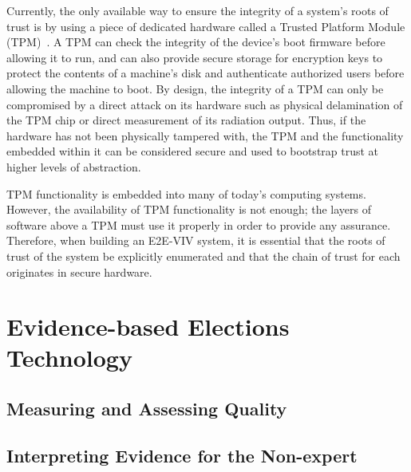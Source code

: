Currently, the only available way to ensure the integrity of a
system's roots of trust is by using a piece of dedicated hardware
called a Trusted Platform Module (TPM)~\cite{TPMSpec}. A TPM can check
the integrity of the device's boot firmware before allowing it to run,
and can also provide secure storage for encryption keys to protect the
contents of a machine's disk and authenticate authorized users before
allowing the machine to boot. By design, the integrity of a TPM can
only be compromised by a direct attack on its hardware such as
physical delamination of the TPM chip or direct measurement of its
radiation output. Thus, if the hardware has not been physically
tampered with, the TPM and the functionality embedded within it can be
considered secure and used to bootstrap trust at higher levels of
abstraction.

TPM functionality is embedded into many of today's computing
systems. However, the availability of TPM functionality is not enough;
the layers of software above a TPM must use it properly in order to
provide any assurance. Therefore, when building an E2E-VIV system, it
is essential that the roots of trust of the system be explicitly
enumerated and that the chain of trust for each originates in secure
hardware.

\section{Evidence-based Elections Technology}


\subsection{Measuring and Assessing Quality}

\subsection{Interpreting Evidence for the Non-expert}

